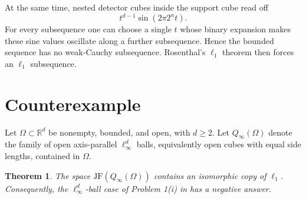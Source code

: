 \documentclass[11pt]{article}
\newtheorem{theorem}{Theorem}
\newcommand{\R}{\mathbb R}
\newcommand{\JF}{\mathrm{JF}}
\begin{document}
At the same time, nested detector cubes inside the support cube read off
\[
t^{d-1}\sin(2\pi 2^n t).
\]
For every subsequence one can choose a single $t$ whose binary expansion makes
these sine values oscillate along a further subsequence.  Hence the bounded
sequence has no weak-Cauchy subsequence.  Rosenthal's $\ell_1$ theorem then
forces an $\ell_1$ subsequence.

\section{Counterexample}

Let $\Omega\subset\R^d$ be nonempty, bounded, and open, with $d\ge2$.  Let
$Q_\infty(\Omega)$ denote the family of open axis-parallel $\ell_\infty^d$
balls, equivalently open cubes with equal side lengths, contained in $\Omega$.

\begin{theorem}\label{thm:counterexample}
The space $\JF(Q_\infty(\Omega))$ contains an isomorphic copy of $\ell_1$.
Consequently, the $\ell_\infty^d$-ball case of Problem 1(i) in
\cite{AMP} has a negative answer.
\end{theorem}
\end{document}
